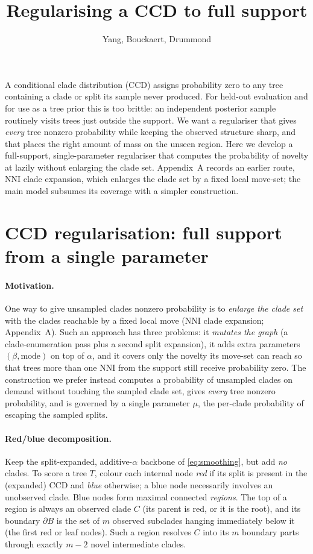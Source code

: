 \documentclass{article}
\begin{document}
\title{Regularising a CCD to full support}
\author{Yang, Bouckaert, Drummond}
\date{}
\maketitle

A conditional clade distribution (CCD) assigns probability zero to any tree
containing a clade or split its sample never produced. For held-out evaluation
and for use as a tree prior this is too brittle: an independent posterior sample
routinely visits trees just outside the support. We want a regulariser that gives
\emph{every} tree nonzero probability while keeping the observed structure sharp,
and that places the right amount of mass on the unseen region. Here we develop a full-support, single-parameter regulariser that computes the probability of novelty at lazily without
enlarging the clade set. Appendix~A records an earlier route, NNI clade expansion,
which enlarges the clade set by a fixed local move-set; the main model
subsumes its coverage with a simpler construction.

\section*{CCD regularisation: full support from a single parameter}

\paragraph{Motivation.}
One way to give unsampled clades nonzero probability is to \emph{enlarge the clade
set} with the clades reachable by a fixed local move (NNI clade expansion;
Appendix~A). Such an approach has three problems: it \emph{mutates the
graph} (a clade-enumeration pass plus a second split expansion), it adds extra parameters
$(\beta,\text{mode})$ on top of $\alpha$, and it covers only the novelty its
move-set can reach so that trees more than one NNI from the support still receive
probability zero. The construction we prefer instead computes a probability of unsampled clades on demand without touching the sampled clade set, gives
\emph{every} tree nonzero probability, and is governed by a single parameter
$\mu$, the per-clade probability of escaping the sampled splits.

\paragraph{Red/blue decomposition.}
Keep the split-expanded, additive-$\alpha$ backbone of \eqref{eq:smoothing}, but
add \emph{no} clades. To score a tree $T$, colour each internal node \emph{red} if
its split is present in the (expanded) CCD and \emph{blue} otherwise; a blue node
necessarily involves an unobserved clade. Blue nodes form maximal connected
\emph{regions}. The top of a region is always an observed clade $C$ (its parent is
red, or it is the root), and its boundary $\partial B$ is the set of $m$ observed
subclades hanging immediately below it (the first red or leaf nodes). Such a
region resolves $C$ into its $m$ boundary parts through exactly $m-2$ novel
intermediate clades.
\end{document}
